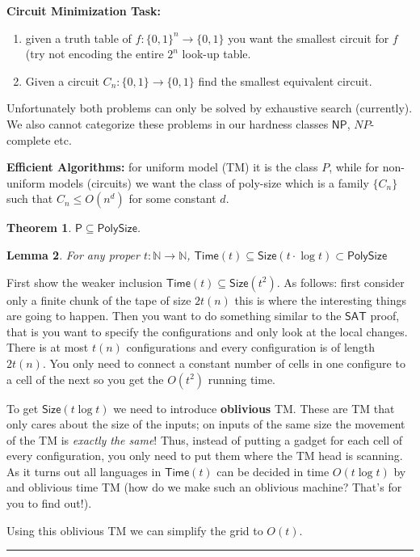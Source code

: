 \documentclass[twoside]{article}
\newcounter{lecnum}
\newtheorem{theorem}{Theorem}[lecnum]
\newtheorem{lemma}[theorem]{Lemma}
\newenvironment{proof}{{\bf Proof:}}{\hfill\rule{2mm}{2mm}}
\def\N{\mathbb{N}}
\def\P{\mathsf{P}}
\def\NP{\mathsf{NP}}
\begin{document}
\textbf{Circuit Minimization Task:} 

\begin{enumerate}
\item given a truth table of $f: \{0,1\}^n \rightarrow \{0,1\}$ you want the smallest circuit for $f$ (try not encoding the entire $2^n$ look-up table.
\item Given a circuit $C_n: \{0,1\} \rightarrow \{0,1\}$ find the smallest equivalent circuit.
\end{enumerate}
Unfortunately both problems can only be solved by exhaustive search (currently). We also cannot categorize these problems in our hardness classes $\NP$, $NP$-complete etc.

\textbf{Efficient Algorithms:} for uniform model (TM) it is the class $P$, while for non-uniform models (circuits) we want the class of poly-size which is a family $\{C_n\}$ such that $C_n \leq O(n^d)$ for some constant $d$. 

\begin{theorem}
$\P \subseteq \mathsf{PolySize}$.
\end{theorem}
\begin{lemma}
For any proper $t: \N \rightarrow \N$, $\mathsf{Time}(t) \subseteq \mathsf{Size}(t\cdot \log t) \subset \mathsf{PolySize}$
\end{lemma}
\begin{proof}
First show the weaker inclusion $\mathsf{Time}(t) \subseteq \mathsf{Size}(t^2)$. As follows: first consider only a finite chunk of the tape of size $2t(n)$ this is where the interesting things are going to happen. Then you want to do something similar to the $\mathsf{SAT}$ proof, that is you want to specify the configurations and only look at the local changes. There is at most $t(n)$ configurations and every configuration is of length $2t(n)$. You only need to connect a constant number of cells in one configure to a cell of the next so you get the $O(t^2)$ running time. 

To get $\mathsf{Size}(t\log t)$ we need to introduce \textbf{oblivious} TM. These are TM that only cares about the size of the inputs; on inputs of the same size the movement of the TM is \emph{exactly the same}! Thus, instead of putting a gadget for each cell of every configuration, you only need to put them where the TM head is scanning. As it turns out all languages in $\mathsf{Time}(t)$ can be decided in time $O(t \log t)$ by and oblivious time TM (how do we make such an oblivious machine? That's for you to find out!).

Using this oblivious TM we can simplify the grid to $O(t)$. 
\end{proof}
\end{document}
